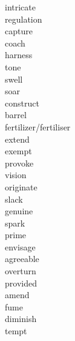 \documentclass[a4paper, 11pt]{ctexart}
\begin{document}
\begin{multicols*}{3}
\begin{description}
\item[intricate]

\item[regulation]

\item[capture]

\item[coach]

\item[harness]

\item[tone]

\item[swell]

\item[soar]

\item[construct]

\item[barrel]

\item[fertilizer/fertiliser]

\item[extend]

\item[exempt]

\item[provoke]

\item[vision]

\item[originate]

\item[slack]

\item[genuine]

\item[spark]

\item[prime]

\item[envisage]

\item[agreeable]

\item[overturn]

\item[provided]

\item[amend]

\item[fume]

\item[diminish]

\item[tempt]


\end{description}
\end{multicols*}
\end{document}

